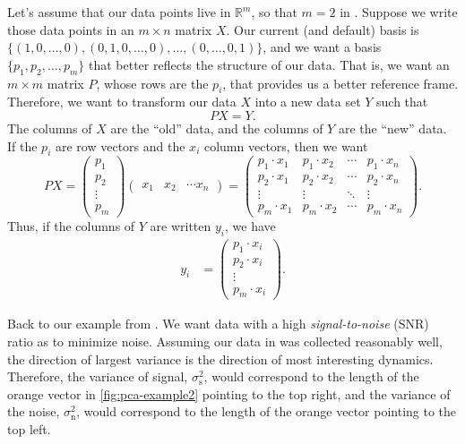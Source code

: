 \documentclass[a4paper, 12pt]{article}
\numberwithin{equation}{section}
\numberwithin{figure}{section}
\theoremstyle{definition}
\newcommand{\R}{\mathbb{R}}
\begin{document}
Let's assume that our data points live in $\R^m$, so that $m=2$ in
. Suppose we write those data points in an $m\times n$
matrix $X$. Our current (and default) basis is $\{(1,0, \dots, 0), (0,1, 0,
\dots, 0), \dots, (0,\dots, 0,1)\}$, and we want a basis $\{p_1,p_2, \dots,
p_m\}$ that better reflects the structure of our data. That is, we want an
$m\times m$ matrix $P$, whose rows are the $p_i$, that provides us a better
reference frame. Therefore, we want to transform our data $X$ into a new data
set $Y$ such that 
\[ 
	PX = Y. 
\] 
The columns of $X$ are the ``old'' data, and the columns of $Y$ are the ``new''
data. If the $p_i$ are row vectors and the $x_i$ column vectors, then we want 
\[ 
	PX = \begin{pmatrix} 
		p_1 \\ p_2 \\ \vdots \\ p_m 
	\end{pmatrix} \begin{pmatrix} 
		x_1 & x_2 & \cdots x_n
	\end{pmatrix} = \begin{pmatrix}
		p_1\cdot x_1 & p_1\cdot x_2 & \cdots & p_1\cdot x_n \\
		p_2 \cdot x_1 & p_2 \cdot x_2 & \cdots & p_2 \cdot x_n \\ 
		\vdots & \vdots & \ddots & \vdots \\
		p_m \cdot x_1 & p_m \cdot x_2 & \cdots & p_m \cdot x_n 
	\end{pmatrix}. 
\] 
Thus, if the columns of $Y$ are written $y_i$, we have 
\begin{align}\label{eqn:proj-P}
	y_i &= \begin{pmatrix}
		p_1 \cdot x_i \\ p_2 \cdot x_i \\ \vdots \\ p_m \cdot x_i
	\end{pmatrix}. 
\end{align}

Back to our example from . We want data with a high
\textit{signal-to-noise} (SNR) ratio as to minimize noise. Assuming our data in
 was collected reasonably well, the direction of largest
variance is the direction of most interesting dynamics. Therefore, the variance
of signal, $\sigma_{\mathrm{s}}^2$, would correspond to the length of the
orange vector in \cref{fig:pca-example2} pointing to the top right, and the
variance of the noise, $\sigma_{\mathrm{n}}^2$, would correspond to the length
of the orange vector pointing to the top left. 
\end{document}
